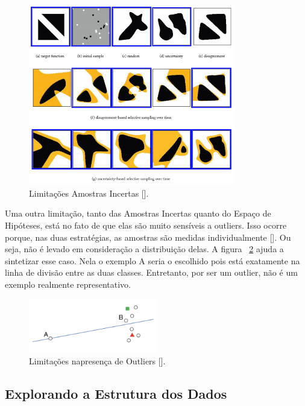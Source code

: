 \begin{figure}
  \centering
  \includegraphics[width=0.8\textwidth]{figures/limitations_incertas.png}
  \caption{Limitações Amostras Incertas [\cite{settles2014active}].}
  \label{fig:limitations_incertas}
\end{figure}

Uma outra limitação, tanto das Amostras Incertas quanto do Espaço de Hipóteses, está no fato de que elas são muito sensíveis a outliers. Isso ocorre porque, nas duas estratégias, as amostras são medidas individualmente [\cite{settles2014active}]. Ou seja, não é levado em consideração a distribuição delas. A figura ~\ref{fig:limitations_outliers} ajuda a sintetizar esse caso. Nela o exemplo A seria o escolhido pois está exatamente na linha de divisão entre as duas classes. Entretanto, por ser um outlier, não é um exemplo realmente representativo. 


\begin{figure}
  \centering
  \includegraphics[width=0.5\textwidth]{figures/limitations_outliers.png}
  \caption{Limitações napresença de Outliers [\cite{settles2014active}].}
  \label{fig:limitations_outliers}
\end{figure}

 \subsection{Explorando a Estrutura dos Dados} 
\label{sec:explorando_estrutura_dados }

